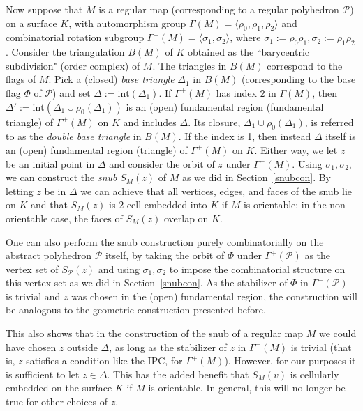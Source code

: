 \documentclass[12pt]{article}
\theoremstyle{definition}\newtheorem{definition}{Definition}[section]
\begin{document}
Now suppose that $M$ is a regular map (corresponding to a regular polyhedron $\mathcal{P}$) on a surface $K$, with automorphism group $\Gamma(M) = \langle \rho_0, \rho_1, \rho_2 \rangle$ and combinatorial rotation subgroup $\Gamma^+(M)= \langle \sigma_1,\sigma_2\rangle$, where $\sigma_{1}:=\rho_0\rho_1, \sigma_{2}:=\rho_1\rho_2$. Consider the triangulation $B(M)$ of $K$ obtained as the ``barycentric subdivision" (order complex) of $M$. The triangles in $B(M)$ correspond to the flags of $M$. Pick a (closed) {\it base triangle} $\Delta_1$ in $B(M)$ (corresponding to the base flag $\Phi$ of $\mathcal{P}$) and set $\Delta:=\text{int}(\Delta_1)$. If $\Gamma^+(M)$ has index $2$ in $\Gamma(M)$, then $\Delta':= \text{int}(\Delta_1 \cup \rho_0(\Delta_1))$ is an (open) fundamental region (fundamental triangle) of $\Gamma^+(M)$ on $K$ and includes $\Delta$. Its closure, $\Delta_1 \cup \rho_0(\Delta_1)$, is referred to as the {\em double base triangle} in $B(M)$. If the index is 1, then instead $\Delta$ itself is an (open) fundamental region (triangle) of $\Gamma^+(M)$ on $K$. Either way, we let $z$ be an initial point in $\Delta$ and consider the orbit of $z$ under $\Gamma^+(M)$. Using  $\sigma_1,\sigma_2$, we can construct the {\it snub\/} $S_M(z)$ of $M$ as we did in Section~\ref{snubcon}. By letting $z$ be in $\Delta$ we can achieve that all vertices, edges, and faces of the snub lie on $K$ and that $S_M(z)$ is 2-cell embedded into $K$ if $M$ is orientable; in the non-orientable case, the faces of $S_M(z)$ overlap on $K$. 

One can also perform the snub construction purely combinatorially on the abstract polyhedron $\mathcal{P}$ itself, by taking the orbit of $\Phi$ under $\Gamma^+(\mathcal{P})$ as the vertex set of ${S}_{\mathcal{P}}(z)$ and using $\sigma_1,\sigma_2$ to impose the combinatorial structure on this vertex set as we did in Section~\ref{snubcon}. As the stabilizer of $\Phi$ in $\Gamma^{+}(\mathcal{P})$ is trivial and $z$ was chosen in the (open) fundamental region, the construction will be analogous to the geometric construction presented before. 

This also shows that in the construction of the snub of a regular map $M$ we could have chosen $z$ outside $\Delta$, as long as the stabilizer of $z$ in $\Gamma^{+}(M)$ is trivial (that is, $z$ satisfies a condition like the IPC, for $\Gamma^{+}(M)$). However, for our purposes it is sufficient to let $z\in\Delta$. This has the added benefit that $S_M(v)$ is cellularly embedded on the surface $K$ if $M$ is orientable. In general, this will no longer be true for other choices of $z$.
\end{document}
